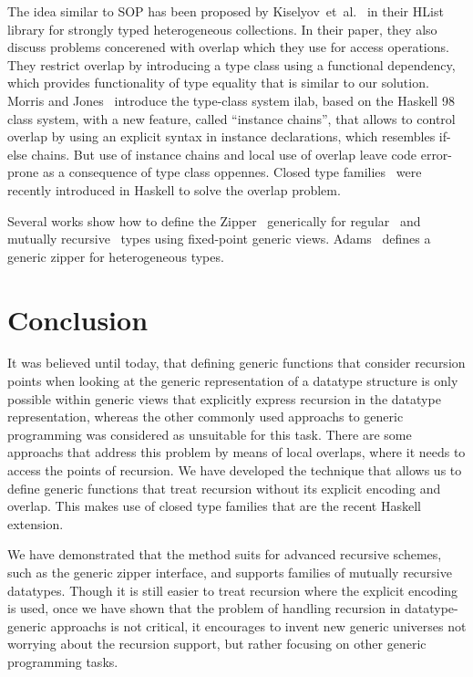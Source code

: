 \documentclass[runningheads]{llncs}
\begin{document}
The idea similar to SOP has been proposed by Kiselyov~et~al.~\cite{Kiselyov2004} in their \textsf{HList} library for strongly typed heterogeneous collections. In their paper, they also discuss problems concerened with overlap which they use for access operations. They restrict overlap by introducing a type class using a functional dependency, which provides functionality of type equality that is similar to our solution. Morris and Jones~\cite{Morris2010} introduce the type-class system \textsf{ilab}, based on the Haskell 98 class system, with a new feature, called ``instance chains'', that allows to control overlap by using an explicit syntax in instance declarations, which resembles if-else chains. But use of instance chains and local use of overlap leave code error-prone as a consequence of type class oppennes. Closed type families~\cite{Eisenberg2014} were recently introduced in Haskell to solve the overlap problem.

Several works show how to define the Zipper~\cite{Huet1997} generically for regular~\cite{HiJeLo2004,McBride2001} and mutually recursive~\cite{MuRec2009} types using fixed-point generic views. Adams~\cite{Adams2010} defines a generic zipper for heterogeneous types.



\section{Conclusion}
\label{sec:conclusion}

It was believed until today, that defining generic functions that consider recursion points when looking at the generic representation of a datatype structure is only possible within generic views that explicitly express recursion in the datatype representation, whereas the other commonly used approachs to generic programming was considered as unsuitable for this task. There are some approachs that address this problem by means of local overlaps, where it needs to access the points of recursion. We have developed the technique that allows us to define generic functions that treat recursion without its explicit encoding and overlap. This makes use of closed type families that are the recent Haskell extension.

We have demonstrated that the method suits for advanced recursive schemes, such as the generic zipper interface, and supports families of mutually recursive datatypes. Though it is still easier to treat recursion where the explicit encoding is used, once we have shown that the problem of handling recursion in datatype-generic approachs is not critical, it encourages to invent new generic universes not worrying about the recursion support, but rather focusing on other generic programming tasks.
\end{document}
